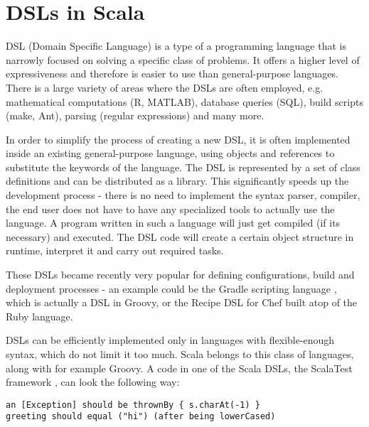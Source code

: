 



\section{DSLs in Scala}
\label{sec:dsls}

DSL (Domain Specific Language) is a type of a programming language that is narrowly focused on solving a specific class of problems. It offers a higher level of expressiveness and therefore is easier to use than general-purpose languages. There is a large variety of areas where the DSLs are often employed, e.g. mathematical computations (R, MATLAB), database queries (SQL), build scripts (make, Ant), parsing (regular expressions) and many more.

In order to simplify the process of creating a new DSL, it is often implemented inside an existing general-purpose language, using objects and references to substitute the keywords of the language. The DSL is represented by a set of class definitions and can be distributed as a library. This significantly speeds up the development process - there is no need to implement the syntax parser, compiler, the end user does not have to have any specialized tools to actually use the language. A program written in such a language will just get compiled (if its necessary) and executed. The DSL code will create a certain object structure in runtime, interpret it and carry out required tasks.

These DSLs became recently very popular for defining configurations, build and deployment processes - an example could be the Gradle scripting language \cite{noauthor_gradle_nodate}, which is actually a DSL in Groovy, or the Recipe DSL for Chef \cite{noauthor_chef_nodate} built atop of the Ruby language.

DSLs can be efficiently implemented only in languages with flexible-enough syntax, which do not limit it too much. Scala belongs to this class of languages, along with for example Groovy. A code in one of the Scala DSLs, the ScalaTest framework \cite{noauthor_scalatest:_2017}, can look the following way:

\lstset{style=Scala}
\begin{lstlisting}
an [Exception] should be thrownBy { s.charAt(-1) }
greeting should equal ("hi") (after being lowerCased)
\end{lstlisting}

